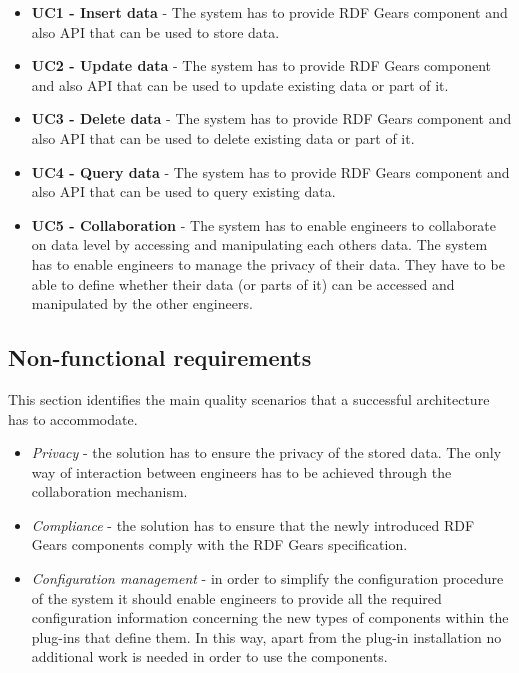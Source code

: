 \begin{itemize}

	\item \textbf{UC1 - Insert data} - The system has to provide RDF Gears component and also API that can be used to store data.

	\item \textbf{UC2 - Update data } - The system has to provide RDF Gears component and also API that can be used to update existing data or part of it.
	
	\item \textbf{UC3 - Delete data} - The system has to provide RDF Gears component and also API that can be used to delete existing data or part of it.
	
	\item \textbf{UC4 - Query data} - The system has to provide RDF Gears component and also API that can be used to query existing data.
	
	\item \textbf{UC5 - Collaboration} - The system has to enable engineers to collaborate on data level by accessing and manipulating each others data. The system has to enable engineers to manage the privacy of their data. They have to be able to define whether their data (or parts of it) can be accessed and manipulated by the other engineers.

\end{itemize}

\subsection{Non-functional requirements}
This section identifies the main quality scenarios that a successful architecture has to accommodate.

\begin{itemize}
	\item \textit{Privacy} - the solution has to ensure the privacy of the stored data. The only way of interaction between engineers has to be achieved through the collaboration mechanism.
	
	\item \textit{Compliance} - the solution has to ensure that the newly introduced RDF Gears components comply with the RDF Gears specification. 
	
	\item \textit{Configuration management} - in order to simplify the configuration procedure of the system it should enable engineers to provide all the required configuration information concerning the new types of components within the plug-ins that define them. In this way, apart from the plug-in installation no additional work is needed in order to use the components.
	
\end{itemize}


